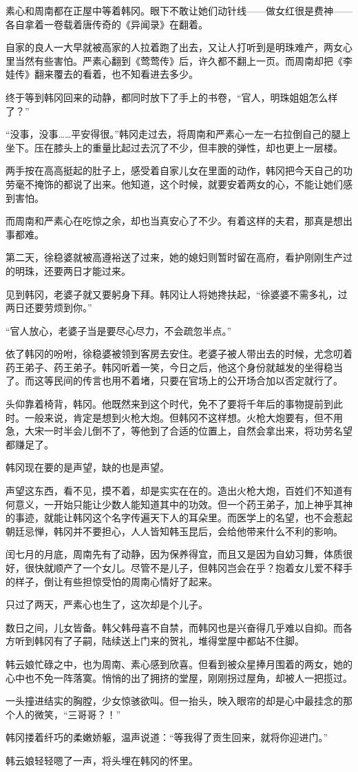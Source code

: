 素心和周南都在正屋中等着韩冈。眼下不敢让她们动针线——做女红很是费神——各自拿着一卷载着唐传奇的《异闻录》在翻着。

自家的良人一大早就被高家的人拉着跑了出去，又让人打听到是明珠难产，两女心里当然有些害怕。严素心翻到《莺莺传》后，许久都不翻上一页。而周南却把《李娃传》翻来覆去的看着，也不知看进去多少。

终于等到韩冈回来的动静，都同时放下了手上的书卷，“官人，明珠姐姐怎么样了？”

“没事，没事……平安得很。”韩冈走过去，将周南和严素心一左一右拉倒自己的腿上坐下。压在膝头上的重量比起过去沉了不少，但丰腴的弹性，却也更上一层楼。

两手按在高高挺起的肚子上，感受着自家儿女在里面的动作，韩冈把今天自己的功劳毫不掩饰的都说了出来。他知道，这个时候，就要安着两女的心，不能让她们感到害怕。

而周南和严素心在吃惊之余，却也当真安心了不少。有着这样的夫君，那真是想出事都难。

第二天，徐稳婆就被高遵裕送了过来，她的媳妇则暂时留在高府，看护刚刚生产过的明珠，还要两日才能过来。

见到韩冈，老婆子就又要躬身下拜。韩冈让人将她搀扶起，“徐婆婆不需多礼，过两日还要劳烦到你。”

“官人放心，老婆子当是要尽心尽力，不会疏忽半点。”

依了韩冈的吩咐，徐稳婆被领到客房去安住。老婆子被人带出去的时候，尤念叨着药王弟子、药王弟子。韩冈听着一笑，今日之后，他这个身份就越发的坐得稳当了。而这等民间的传言也用不着堵，只要在官场上的公开场合加以否定就行了。

头仰靠着椅背，韩冈。他既然来到这个时代，免不了要将千年后的事物提前到此时。一般来说，肯定是想到火枪大炮。但韩冈不这样想。火枪大炮要有，但不用急，大宋一时半会儿倒不了，等他到了合适的位置上，自然会拿出来，将功劳名望都赚足了。

韩冈现在要的是声望，缺的也是声望。

声望这东西，看不见，摸不着，却是实实在在的。造出火枪大炮，百姓们不知道有何意义，一开始只能让少数人能知道其中的功效。但一个药王弟子，加上神乎其神的事迹，就能让韩冈这个名字传遍天下人的耳朵里。而医学上的名望，也不会惹起朝廷忌惮，韩冈并不要担心，人人皆知韩玉昆后，会给他带来什么不利的影响。

闰七月的月底，周南先有了动静，因为保养得宜，而且又是因为自幼习舞，体质很好，很快就顺产了一个女儿。尽管不是儿子，但韩冈岂会在乎？抱着女儿爱不释手的样子，倒让有些担惊受怕的周南心情好了起来。

只过了两天，严素心也生了，这次却是个儿子。

数日之间，儿女皆备。韩父韩母喜不自禁，而韩冈也是兴奋得几乎难以自抑。而各方听到韩冈有了子嗣，陆续送上门来的贺礼，堆得堂屋中都站不住脚。

韩云娘忙碌之中，也为周南、素心感到欣喜。但看到被众星捧月围着的两女，她的心中也不免一阵落寞。悄悄的出了拥挤的堂屋，刚刚拐过屋角，却被人一把揽过。

一头撞进结实的胸膛，少女惊骇欲叫。但一抬头，映入眼帘的却是心中最挂念的那个人的微笑，“三哥哥？！”

韩冈搂着纤巧的柔嫩娇躯，温声说道：“等我得了贡生回来，就将你迎进门。”

韩云娘轻轻嗯了一声，将头埋在韩冈的怀里。

